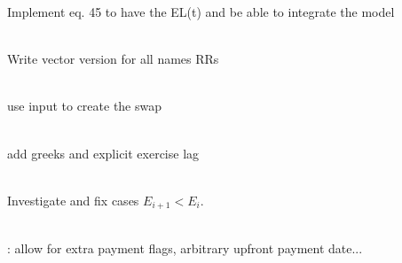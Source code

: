 \begin{DoxyRefList}
Implement eq. 45 to have the EL(t) and be able to integrate the model  
\item[Member \doxylink{class_quant_lib_1_1_spot_recovery_latent_model_acd31d1e5570a5b9a1bf5af75616bcc84}{Quant\+Lib\+::Spot\+Recovery\+Latent\+Model\texorpdfstring{$<$}{<} copula\+Policy \texorpdfstring{$>$}{>}\+::latent\+RRVar\+Value} (const std\+::vector$<$ Real $>$ \&all\+Factors, \doxylink{namespace_quant_lib_af4cc4ef40b52c17cc455ead2a97aedb3}{Size} i\+Name) const]\hfill \\
\label{todo__todo000024}%
%
Write vector version for all names\textquotesingle{} RRs  
\item[Class \doxylink{class_quant_lib_1_1_swap_rate_helper}{Quant\+Lib\+::Swap\+Rate\+Helper} ]\hfill \\
\label{todo__todo000076}%
%
use input  to create the swap  
\item[Class \doxylink{class_quant_lib_1_1_swaption}{Quant\+Lib\+::Swaption} ]\hfill \\
\label{todo__todo000044}%
%
add greeks and explicit exercise lag  
\item[Class \doxylink{class_quant_lib_1_1_synthetic_c_d_o}{Quant\+Lib\+::Synthetic\+CDO} ]\hfill \\
\label{todo__todo000025}%
%
Investigate and fix cases $ E_{i+1} < E_i. $  
\item[Member \doxylink{class_quant_lib_1_1_synthetic_c_d_o_a41e8ceaf6791efa2d14a942e60031a5a}{Quant\+Lib\+::Synthetic\+CDO\+::Synthetic\+CDO} (const ext\+::shared\+\_\+ptr$<$ Basket $>$ \&basket, Protection\+::\+Side side, \doxylink{class_quant_lib_1_1_schedule}{Schedule} schedule, \doxylink{namespace_quant_lib_a919ba3567cc89fca373f8d6b8e80126b}{Rate} upfront\+Rate, \doxylink{namespace_quant_lib_a919ba3567cc89fca373f8d6b8e80126b}{Rate} running\+Rate, const \doxylink{class_quant_lib_1_1_day_counter}{Day\+Counter} \&day\+Counter, \doxylink{namespace_quant_lib_ac95a4b5bc8017f1eb4ad0b54a9af3881}{Business\+Day\+Convention} payment\+Convention, ext\+::optional$<$ Real $>$ notional=ext\+::nullopt)]\hfill \\
\label{todo__todo000026}%
%
\+: allow for extra payment flags, arbitrary upfront payment date...  
\item[Class \doxylink{class_quant_lib_1_1_tibor}{Quant\+Lib\+::Tibor} ]\hfill \\

\end{DoxyRefList}
